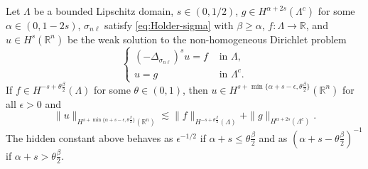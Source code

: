 \documentclass[10pt,a4paper]{amsart}
\def\R{{\mathbb R}}
\newcommand{\domain}{\Lambda}
\newcommand{\snl}{{\sigma_{n\ell}}}
\begin{document}
\begin{theorem} \label{thm:reg-nl-s-small}
Let $\domain$ be a bounded Lipschitz domain, $s \in (0,1/2)$, $g \in H^{\alpha+2s}(\domain^c)$ for some $\alpha \in (0, 1-2s)$, $\snl$ satisfy \eqref{eq:Holder-sigma} with $\beta \ge \alpha$, $f\colon \domain \to \R$, and $u \in H^s(\R^n)$ be the weak solution to the non-homogeneous Dirichlet problem
\[
 \left\lbrace \begin{aligned}
(-\Delta_\snl)^s  u = f  & \mbox{ in } \domain, \\
u = g & \mbox{ in } \domain^c.
\end{aligned} \right.
\]
If $f\in H^{-s+\theta \frac\beta{2}}(\domain)$ for some $\theta \in (0,1)$, then $u \in H^{s+\min\{ \alpha+s-\epsilon, \theta\frac\beta2 \}}(\R^n)$  for all $\epsilon > 0$ and
\begin{equation} \label{eq:max-reg-p-big}
\| u \|_{H^{s+\min\{ \alpha+s-\epsilon, \theta\frac\beta2 \}}(\R^n)} \lesssim  \| f  \|_{H^{-s+\theta\frac\beta2}(\domain)} + \| g \|_{H^{\alpha+2s} (\domain^c)}.
\end{equation}
The hidden constant above behaves as $\epsilon^{-1/2}$ if $\alpha+s \le \theta\frac\beta2$ and as $(\alpha+s-\theta\frac\beta2)^{-1}$ if $\alpha +s > \theta \frac\beta{2}$.
\end{theorem}
\end{document}
